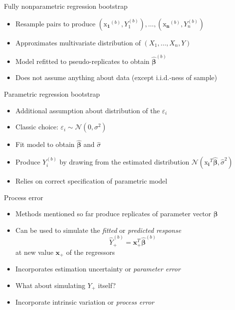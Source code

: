 \documentclass[tikz]{beamer}
\begin{document}
\begin{frame}{Fully nonparametric regression bootstrap}
  \begin{itemize}
    \item Resample pairs to produce $(\bm{\mathrm{x}_1}^{(b)}, Y^{(b)}_1), \dots, (\bm{\mathrm{x}_n}^{(b)}, Y^{(b)}_n)$
    \item Approximates multivariate distribution of $(X_1, \dots, X_n, Y)$
    \item Model refitted to pseudo-replicates to obtain $\widehat{\bm{\beta}}^{(b)}$
    \item Does not assume anything about data (except i.i.d.-ness of sample)
  \end{itemize}
\end{frame}

\begin{frame}{Parametric regression bootstrap}
  \begin{itemize}
    \item Additional assumption about distribution of the $\varepsilon_i$
    \item Classic choice: $\varepsilon_i \sim \mathcal{N}(0, \sigma^2)$
    \item Fit model to obtain $\widehat{\bm{\beta}}$ and $\widehat{\sigma}$
    \item Produce $Y^{(b)}_i$ by drawing from the estimated distribution $\mathcal{N}(\bm{\mathrm{x}_i}^T \widehat{\bm{\beta}}, \widehat{\sigma}^2)$
    \item Relies on correct specification of parametric model
  \end{itemize}
\end{frame}

\begin{frame}{Process error}
  \begin{itemize}
    \item Methods mentioned so far produce replicates of parameter vector $\bm{\beta}$
    \item Can be used to simulate the \emph{fitted} or \emph{predicted response}
          \begin{equation*}
            \widehat{Y}^{(b)}_+ = \mathbf{x}^T_+ \widehat{\bm{\beta}}^{(b)}
          \end{equation*}
          at new value $\mathbf{x_+}$ of the regressors
    \item Incorporates estimation uncertainty or \emph{parameter error}
    \item What about simulating $Y_+$ itself?
    \item Incorporate intrinsic variation or \emph{process error}
  \end{itemize}
\end{frame}
\end{document}
